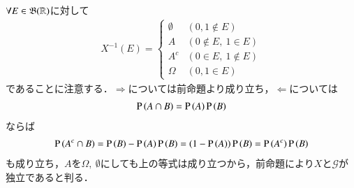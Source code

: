 	\begin{prf}
		$\forall E \in \mathfrak{B}(\mathbb{R})$に対して
		\begin{align}
			X^{-1}(E) =
			\begin{cases}
				\emptyset & (0,1 \notin E) \\
				A & (0 \notin E,\ 1 \in E) \\
				A^c & (0 \in E,\ 1 \notin E) \\
				\Omega & (0, 1 \in E)
			\end{cases}
		\end{align}
		であることに注意する．$\Rightarrow$については前命題より成り立ち，$\Leftarrow$については
		\begin{align}
			\operatorname{P} \left(A \cap B\right) = \operatorname{P} \left(A\right)\operatorname{P} \left(B\right)
		\end{align}
		ならば
		\begin{align}
			\operatorname{P} \left(A^c \cap B\right) = \operatorname{P} \left(B\right) -\operatorname{P} \left(A\right)\operatorname{P} \left(B\right)  = (1 - \operatorname{P} \left(A\right))\operatorname{P} \left(B\right) = \operatorname{P} \left(A^c\right)\operatorname{P} \left(B\right)
		\end{align}
		も成り立ち，$A$を$\Omega,\ \emptyset$にしても上の等式は成り立つから，前命題により$X$と$\mathcal{G}$が独立であると判る．
		\QED
	\end{prf}